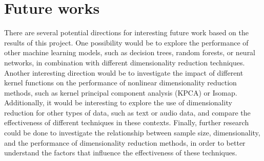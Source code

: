 \section{Future works}

There are several potential directions for interesting future work based on the results of this project. One possibility would be to explore the performance of other machine learning models, such as decision trees, random forests, or neural networks, in combination with different dimensionality reduction techniques. Another interesting direction would be to investigate the impact of different kernel functions on the performance of nonlinear dimensionality reduction methods, such as kernel principal component analysis (KPCA) or Isomap. Additionally, it would be interesting to explore the use of dimensionality reduction for other types of data, such as text or audio data, and compare the effectiveness of different techniques in these contexts. Finally, further research could be done to investigate the relationship between sample size, dimensionality, and the performance of dimensionality reduction methods, in order to better understand the factors that influence the effectiveness of these techniques.
